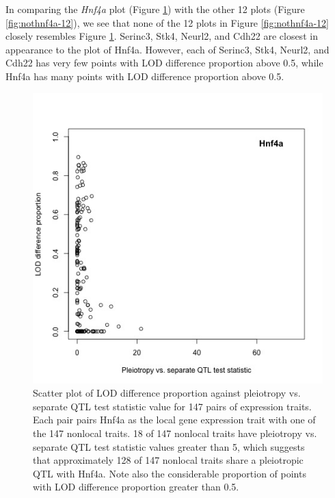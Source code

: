 \documentclass{article}
\begin{document}
In comparing the \emph{Hnf4a} plot (Figure \ref{fig:hnf4a}) with the other 12 plots (Figure \ref{fig:nothnf4a-12}), we see that none of the 12 plots in Figure \ref{fig:nothnf4a-12} closely resembles Figure \ref{fig:hnf4a}. Serinc3, Stk4, Neurl2, and Cdh22 are closest in appearance to the plot of Hnf4a. However, each of Serinc3, Stk4, Neurl2, and Cdh22 has very few points with LOD difference proportion above 0.5, while Hnf4a has many points with LOD difference proportion above 0.5.





\begin{figure}
    \centering
    \includegraphics[width = \textwidth]{baseR-Hnf4a.jpg}
    \caption{Scatter plot of LOD difference proportion against pleiotropy vs. separate QTL test statistic value for 147 pairs of expression traits. Each pair pairs Hnf4a as the local gene expression trait with one of the 147 nonlocal traits. 18 of 147 nonlocal traits have pleiotropy vs. separate QTL test statistic values greater than 5, which suggests that approximately 128 of 147 nonlocal traits share a pleiotropic QTL with Hnf4a. Note also the considerable proportion of points with LOD difference proportion greater than 0.5.}
    \label{fig:hnf4a}
\end{figure}
\end{document}
